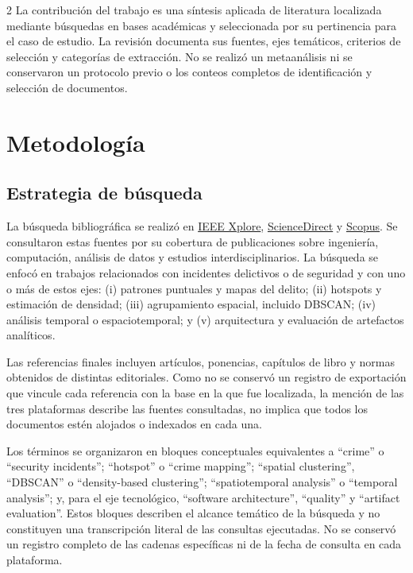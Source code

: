 \documentclass[10pt,twoside]{article}
\begin{document}
\begin{multicols}{2}
La contribución del trabajo es una síntesis aplicada de literatura localizada mediante búsquedas en bases académicas y seleccionada por su pertinencia para el caso de estudio. La revisión documenta sus fuentes, ejes temáticos, criterios de selección y categorías de extracción. No se realizó un metaanálisis ni se conservaron un protocolo previo o los conteos completos de identificación y selección de documentos.

\section{Metodología}

\subsection{Estrategia de búsqueda}

La búsqueda bibliográfica se realizó en \href{https://ieeexplore.ieee.org/}{IEEE Xplore}, \href{https://www.sciencedirect.com/}{ScienceDirect} y \href{https://www.scopus.com/}{Scopus}. Se consultaron estas fuentes por su cobertura de publicaciones sobre ingeniería, computación, análisis de datos y estudios interdisciplinarios. La búsqueda se enfocó en trabajos relacionados con incidentes delictivos o de seguridad y con uno o más de estos ejes: (i) patrones puntuales y mapas del delito; (ii) hotspots y estimación de densidad; (iii) agrupamiento espacial, incluido DBSCAN; (iv) análisis temporal o espaciotemporal; y (v) arquitectura y evaluación de artefactos analíticos.

Las referencias finales incluyen artículos, ponencias, capítulos de libro y normas obtenidos de distintas editoriales. Como no se conservó un registro de exportación que vincule cada referencia con la base en la que fue localizada, la mención de las tres plataformas describe las fuentes consultadas, no implica que todos los documentos estén alojados o indexados en cada una.

Los términos se organizaron en bloques conceptuales equivalentes a ``crime'' o ``security incidents''; ``hotspot'' o ``crime mapping''; ``spatial clustering'', ``DBSCAN'' o ``density-based clustering''; ``spatiotemporal analysis'' o ``temporal analysis''; y, para el eje tecnológico, ``software architecture'', ``quality'' y ``artifact evaluation''. Estos bloques describen el alcance temático de la búsqueda y no constituyen una transcripción literal de las consultas ejecutadas. No se conservó un registro completo de las cadenas específicas ni de la fecha de consulta en cada plataforma.


\end{multicols}
\end{document}
